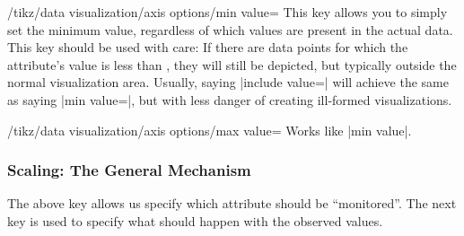 \begin{key}{/tikz/data visualization/axis options/min value=}
    This key allows you to simply set the minimum value, regardless of which
    values are present in the actual data. This key should be used with care:
    If there are data points for which the attribute's value is less than
    , they will still be depicted, but typically outside the normal
    visualization area. Usually, saying |include value=| will
    achieve the same as saying |min value=|, but with less danger
    of creating ill-formed visualizations.
\end{key}

\begin{key}{/tikz/data visualization/axis options/max value=}
    Works like |min value|.
\end{key}


\subsubsection{Scaling: The General Mechanism}

The above key allows us specify which attribute should be ``monitored''. The
next key is used to specify what should happen with the observed values.

